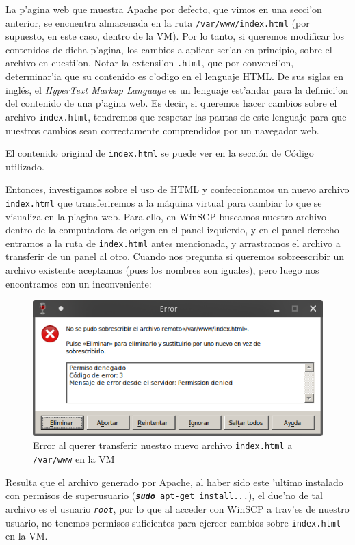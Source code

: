 \documentclass[11pt]{article}
\begin{document}
	La p'agina web que muestra Apache por defecto, que vimos en una secci'on anterior, se encuentra almacenada en la ruta \verb|/var/www/index.html| (por supuesto, en este caso, dentro de la VM). Por lo tanto, si queremos modificar los contenidos de dicha p'agina, los cambios a aplicar ser'an en principio, sobre el archivo en cuesti'on. Notar la extensi'on \texttt{.html}, que por convenci'on, determinar'ia que su contenido es c'odigo en el lenguaje HTML. De sus siglas en inglés, el \textit{HyperText Markup Language} es un lenguaje est'andar para la definici'on del contenido de una p'agina web. Es decir, si queremos hacer cambios sobre el archivo \texttt{index.html}, tendremos que respetar las pautas de este lenguaje para que nuestros cambios sean correctamente comprendidos por un navegador web. 
	
	El contenido original de \label{fig:index_orig_code}\texttt{index.html} se puede ver en la sección de Código utilizado. 
	
	Entonces, investigamos sobre el uso de HTML y confeccionamos un nuevo archivo \texttt{index.html} que transferiremos a la máquina virtual para cambiar lo que se visualiza en la p'agina web. Para ello, en WinSCP buscamos nuestro archivo dentro de la computadora de origen en el panel izquierdo, y en el panel derecho entramos a la ruta de \texttt{index.html} antes mencionada, y arrastramos el archivo a transferir de un panel al otro. Cuando nos pregunta si queremos sobreescribir un archivo existente aceptamos (pues los nombres son iguales), pero luego nos encontramos con un inconveniente:
	
	\begin{figure}[H]
		\centering \captionsetup{justification=centering}
		\includegraphics[width=.8\linewidth]{Images/WinSCP/fig4}
		\caption{Error al querer transferir nuestro nuevo archivo \texttt{index.html} a \texttt{/var/www} en la VM}
	\end{figure}

	Resulta que el archivo generado por Apache, al haber sido este 'ultimo instalado con permisos de superusuario (\texttt{\emph{\textbf{sudo}} apt-get install...}), el due'no de tal archivo es el usuario \texttt{\emph{root}}, por lo que al acceder con WinSCP a trav'es de nuestro usuario, no tenemos permisos suficientes para ejercer cambios sobre \texttt{index.html} en la VM.
	
\end{document}
